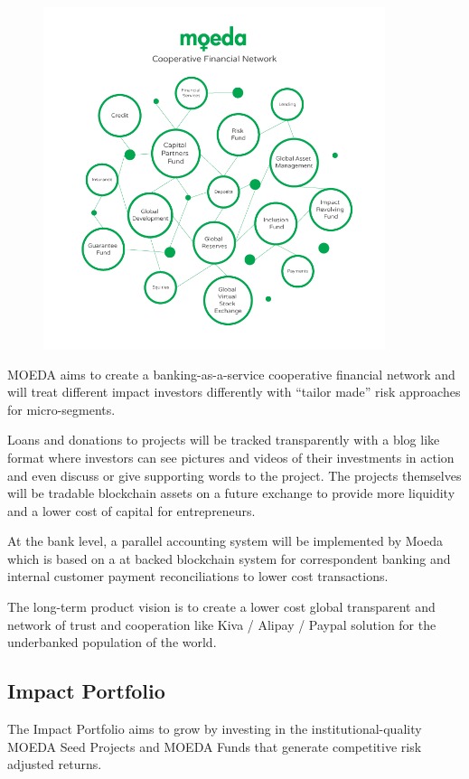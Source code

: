 \documentclass{article}
\begin{document}
\begin{figure}[h]
    \centering
    \includegraphics[width=10cm,keepaspectratio]{network}
\end{figure}

MOEDA aims to create a banking-as-a-service cooperative financial network and will treat different impact investors differently with “tailor made” risk approaches for micro-segments. 

Loans and donations to projects will be tracked transparently with a blog like format where investors can see pictures and videos of their investments in action and even discuss or give supporting words to the project. The projects themselves will be tradable blockchain assets on a future exchange to provide more liquidity and a lower cost of capital for entrepreneurs. 

At the bank level, a parallel accounting system will be implemented by Moeda which is based on a at backed blockchain system for correspondent banking and internal customer payment reconciliations to lower cost transactions. 

The long-term product vision is to create a lower cost global transparent and network of trust and cooperation like Kiva / Alipay / Paypal solution for the underbanked population of the world.


\subsection {Impact Portfolio}

The Impact Portfolio aims to grow by investing in the institutional-quality MOEDA Seed Projects and MOEDA Funds that generate competitive risk adjusted returns. 
\end{document}
